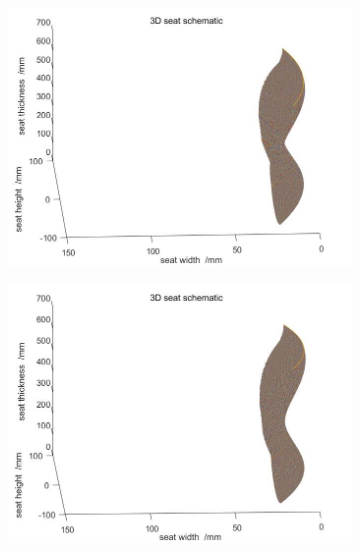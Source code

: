                 \begin{figure}[H]
                    \centering
                    \begin{subfigure}[b]{0.4\textwidth}
                        \includegraphics[width=\textwidth]{images/seat_body_back_near_curve1.jpg}
                    \end{subfigure}
                    \begin{subfigure}[b]{0.4\textwidth}
                        \includegraphics[width=\textwidth]{images/seat_body_back_near_curve2.jpg}
                    \end{subfigure}
                    \begin{subfigure}[b]{0.4\textwidth}

\end{subfigure}
\end{figure}
